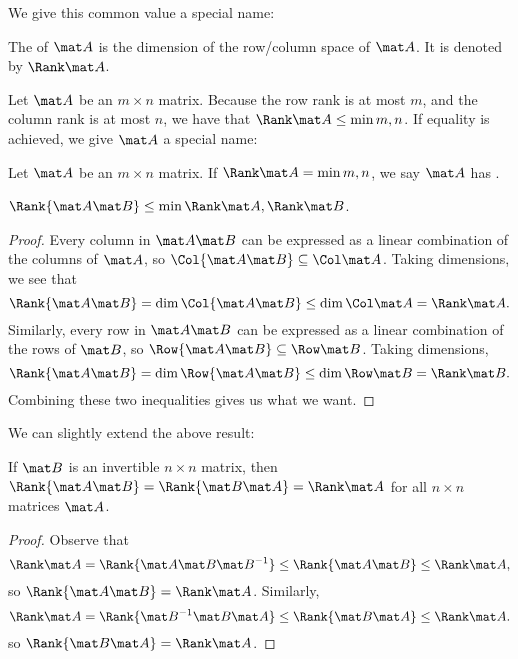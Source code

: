 We give this common value a special name:

\begin{definition}
    The  of $\mat A$ is the dimension of the row/column space of $\mat A$. It is denoted by $\Rank \mat A$.
\end{definition}

Let $\mat A$ be an $m \times n$ matrix. Because the row rank is at most $m$, and the column rank is at most $n$, we have that $\Rank \mat A \leq \min{m, n}$. If equality is achieved, we give $\mat A$ a special name:

\begin{definition}
    Let $\mat A$ be an $m \times n$ matrix. If $\Rank \mat A = \min{m, n}$, we say $\mat A$ has .
\end{definition}

\begin{proposition}
    $\Rank{\mat A \mat B} \leq \min{\Rank \mat A, \Rank \mat B}$.
\end{proposition}
\begin{proof}
    Every column in $\mat A \mat B$ can be expressed as a linear combination of the columns of $\mat A$, so $\Col{\mat A \mat B} \subseteq \Col \mat A$. Taking dimensions, we see that \[\Rank{\mat A \mat B} = \dim \Col{\mat A \mat B} \leq \dim \Col \mat A = \Rank \mat A.\] Similarly, every row in $\mat A \mat B$ can be expressed as a linear combination of the rows of $\mat B$, so $\Row{\mat A \mat B} \subseteq \Row \mat B$. Taking dimensions, \[\Rank{\mat A \mat B} = \dim \Row{\mat A \mat B} \leq \dim \Row \mat B = \Rank \mat B.\] Combining these two inequalities gives us what we want.
\end{proof}

We can slightly extend the above result:

\begin{proposition}
    If $\mat B$ is an invertible $n \times n$ matrix, then $\Rank{\mat A \mat B} = \Rank{\mat B \mat A} = \Rank \mat A$ for all $n \times n$ matrices $\mat A$.
\end{proposition}
\begin{proof}
    Observe that \[\Rank \mat A = \Rank{\mat A \mat B \mat B^{-1}} \leq \Rank{\mat A \mat B} \leq \Rank \mat A,\] so $\Rank{\mat A \mat B} = \Rank \mat A$. Similarly, \[\Rank \mat A = \Rank{\mat B^{-1} \mat B \mat A} \leq \Rank{\mat B \mat A} \leq \Rank \mat A.\] so $\Rank{\mat B \mat A} = \Rank \mat A$.
\end{proof}

